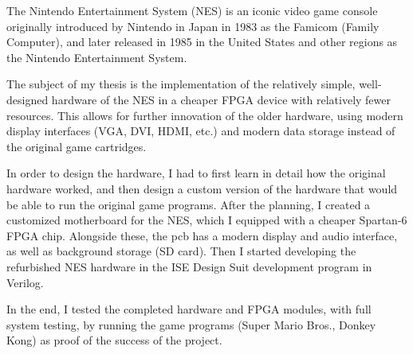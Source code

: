 The Nintendo Entertainment System (NES) is an iconic video game console originally introduced by Nintendo in Japan in 1983 as the Famicom (Family Computer), and later released in 1985 in the United States and other regions as the Nintendo Entertainment System.

The subject of my thesis is the implementation of the relatively simple, well-designed hardware of the NES in a cheaper FPGA device with relatively fewer resources. This allows for further innovation of the older hardware, using modern display interfaces (VGA, DVI, HDMI, etc.) and modern data storage instead of the original game cartridges.

In order to design the hardware, I had to first learn in detail how the original hardware worked, and then design a custom version of the hardware that would be able to run the original game programs. After the planning, I created a customized motherboard for the NES, which I equipped with a cheaper Spartan-6 FPGA chip. Alongside these, the pcb has a modern display and audio interface, as well as background storage (SD card). Then I started developing the refurbished NES hardware in the ISE Design Suit development program in Verilog.

In the end, I tested the completed hardware and FPGA modules, with full system testing, by running the game programs (Super Mario Bros., Donkey Kong) as proof of the success of the project.

\vfill
\selectthesislanguage

\setcounter{romanPage}{\value{page}}
